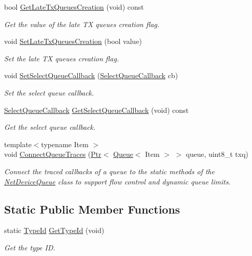 \begin{DoxyCompactItemize}
bool \hyperlink{classns3_1_1NetDeviceQueueInterface_accbd3f06bba292cad24f182fe4781866}{Get\+Late\+Tx\+Queues\+Creation} (void) const 
\begin{DoxyCompactList}\small\item\em Get the value of the late TX queues creation flag. \end{DoxyCompactList}\item 
void \hyperlink{classns3_1_1NetDeviceQueueInterface_a3ef132661ab5e2bf95731b4a4d558a52}{Set\+Late\+Tx\+Queues\+Creation} (bool value)
\begin{DoxyCompactList}\small\item\em Set the late TX queues creation flag. \end{DoxyCompactList}\item 
void \hyperlink{classns3_1_1NetDeviceQueueInterface_a68374e8da852c51c23cfe8bccb4ea085}{Set\+Select\+Queue\+Callback} (\hyperlink{classns3_1_1NetDeviceQueueInterface_aaac934ccd4f0cf5517b2b0a0f4ab7a5a}{Select\+Queue\+Callback} cb)
\begin{DoxyCompactList}\small\item\em Set the select queue callback. \end{DoxyCompactList}\item 
\hyperlink{classns3_1_1NetDeviceQueueInterface_aaac934ccd4f0cf5517b2b0a0f4ab7a5a}{Select\+Queue\+Callback} \hyperlink{classns3_1_1NetDeviceQueueInterface_a01d5999111f0f3601b052ff511bee56c}{Get\+Select\+Queue\+Callback} (void) const 
\begin{DoxyCompactList}\small\item\em Get the select queue callback. \end{DoxyCompactList}\item 
{\footnotesize template$<$typename Item $>$ }\\void \hyperlink{classns3_1_1NetDeviceQueueInterface_acaa7ba9c954d410eca3d2d9a2a69fe09}{Connect\+Queue\+Traces} (\hyperlink{classns3_1_1Ptr}{Ptr}$<$ \hyperlink{classns3_1_1Queue}{Queue}$<$ Item $>$ $>$ queue, uint8\+\_\+t txq)
\begin{DoxyCompactList}\small\item\em Connect the traced callbacks of a queue to the static methods of the \hyperlink{classns3_1_1NetDeviceQueue}{Net\+Device\+Queue} class to support flow control and dynamic queue limits. \end{DoxyCompactList}\end{DoxyCompactItemize}
\subsection*{Static Public Member Functions}
\begin{DoxyCompactItemize}
\item 
static \hyperlink{classns3_1_1TypeId}{Type\+Id} \hyperlink{classns3_1_1NetDeviceQueueInterface_a7916804b203f7bfa3b31928464265e9d}{Get\+Type\+Id} (void)
\begin{DoxyCompactList}\small\item\em Get the type ID. \end{DoxyCompactList}\end{DoxyCompactItemize}
